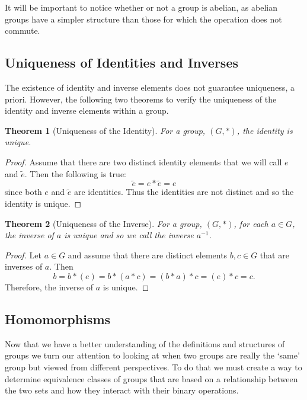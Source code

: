 \documentclass[
]{book}
\newtheorem{theorem}{Theorem}[chapter]
\theoremstyle{definition}
\theoremstyle{definition}
\theoremstyle{definition}
\theoremstyle{definition}
\theoremstyle{remark}
\begin{document}
It will be important to notice whether or not a group is abelian, as abelian groups have a simpler structure than those for which the operation does not commute.

\hypertarget{uniqueness-of-identities-and-inverses}{%
\subsection{Uniqueness of Identities and Inverses}\label{uniqueness-of-identities-and-inverses}}

The existence of identity and inverse elements does not guarantee uniqueness, a priori. However, the following two theorems to verify the uniqueness of the identity and inverse elements within a group.

\begin{theorem}[Uniqueness of the Identity]
For a group, \((G,*)\), the identity is unique.
\end{theorem}

\begin{proof}
Assume that there are two distinct identity elements that we will call \(e\) and \(\tilde{e}\). Then the following is true:\[\tilde{e}= e*\tilde{e} = e\] since both \(e\) and \(\tilde{e}\) are identities. Thus the identities are not distinct and so the identity is unique.
\end{proof}

\begin{theorem}[Uniqueness of the Inverse]
\protect\hypertarget{thm:unique-inverse}{}\label{thm:unique-inverse}For a group, \((G,*)\), for each \(a\in G\), the inverse of \(a\) is unique and so we call the inverse \(a^{-1}\).
\end{theorem}

\begin{proof}
Let \(a\in G\) and assume that there are distinct elements \(b,c \in G\) that are inverses of \(a\). Then \[b= b * (e)= b* (a*c)= (b*a)*c = (e)*c = c.\] Therefore, the inverse of \(a\) is unique.
\end{proof}

\hypertarget{homomorphisms}{%
\subsection{Homomorphisms}\label{homomorphisms}}

Now that we have a better understanding of the definitions and structures of groups we turn our attention to looking at when two groups are really the `same' group but viewed from different perspectives. To do that we must create a way to determine equivalence classes of groups that are based on a relationship between the two sets and how they interact with their binary operations.
\end{document}
